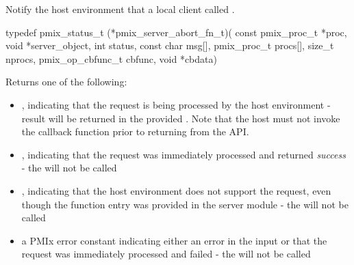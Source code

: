 \summary

Notify the host environment that a local client called .

\format

\cspecificstart
\begin{codepar}
typedef pmix_status_t (*pmix_server_abort_fn_t)(
                             const pmix_proc_t *proc,
                             void *server_object,
                             int status,
                             const char msg[],
                             pmix_proc_t procs[],
                             size_t nprocs,
                             pmix_op_cbfunc_t cbfunc,
                             void *cbdata)
\end{codepar}
\cspecificend


\begin{arglist}
\end{arglist}

Returns one of the following:

\begin{itemize}
    \item {}, indicating that the request is being processed by the host environment - result will be returned in the provided . Note that the host must not invoke the callback function prior to returning from the \ac{API}.
    \item {}, indicating that the request was immediately processed and returned \textit{success} - the  will not be called
    \item {}, indicating that the host environment does not support the request, even though the function entry was provided in the server module - the  will not be called
    \item a PMIx error constant indicating either an error in the input or that the request was immediately processed and failed - the  will not be called
\end{itemize}

